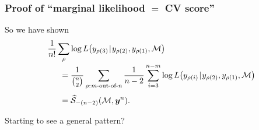 \documentclass[18pt]{beamer}
\newcommand{\given}{\thinnerspace | \thinnerspace}
\newcommand{\spacedColon}{\mkern .5mu : \mkern 1mu}
\newcommand{\thinnerspace}{\mskip.5\thinmuskip}
\newcommand{\likelihood}{L}
\newcommand{\by}{\bm{y}}
\newcommand{\score}{\mathcal{S}}
\newcommand{\modelSymbol}{\mathcal{M}}
\newcommand{\permutation}{\rho}
\newcommand{\trainingSize}{m}
\newcommand{\testSampleIndex}{i}
\begin{document}
\begin{frame}
\frametitle{Proof of ``marginal likelihood $=$ {\large CV} score''}
So we have shown
\begin{equation*}
\setlength{\jot}{0\baselineskip}
\begin{aligned}
&\frac{1}{n!} \sum_\permutation \log \likelihood\!\left(y_{\permutation(3)} \given y_{\permutation(2)}, y_{\permutation(1)}, \modelSymbol \right) \\
	&\hspace*{1.5em}= \frac{1}{{n \choose 2}} \sum_{\permutation \spacedColon \text{$\trainingSize$-out-of-$n$}}
		\frac{1}{n - 2} \sum_{\testSampleIndex = 3}^{n - \trainingSize} \log \likelihood\!\left(y_{\permutation(\testSampleIndex)} \given y_{\permutation(2)}, y_{\permutation(1)}, \modelSymbol \right) \\[.5\baselineskip]
	&\hspace*{1.5em}= \widehat{\score}_{-(n - 2)}(\modelSymbol, \by^n).
\end{aligned}
\end{equation*}

Starting to see a general pattern?
\end{frame}
\end{document}

